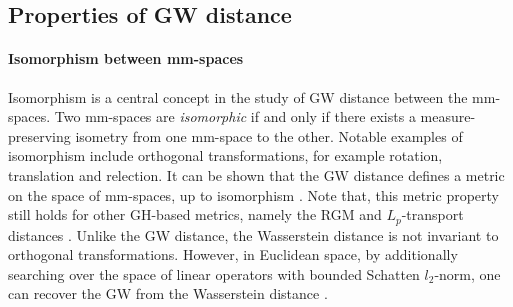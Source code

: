 \subsection{Properties of GW distance} \label{subsec:prop_gw}
\paragraph{Isomorphism between mm-spaces}
Isomorphism is a central concept in the study of GW distance between the mm-spaces.
Two mm-spaces are \textit{isomorphic}
if and only if there exists a measure-preserving isometry from
one mm-space to the other. Notable examples of isomorphism include orthogonal transformations,
for example rotation, translation and relection.
It can be shown that the GW distance defines a metric on the space of mm-spaces,
up to isomorphism \citep{Memoli07,Sturm12}.
Note that, this metric property still holds for other GH-based metrics,
namely the RGM and $L_p$-transport distances \citep{Sturm06,Hur21}. Unlike the GW distance,
the Wasserstein distance is not invariant to orthogonal transformations. However,
in Euclidean space, by additionally searching over the space of linear operators with
bounded Schatten $l_2$-norm, one can recover the GW from the Wasserstein distance \citep{Melis19}.

